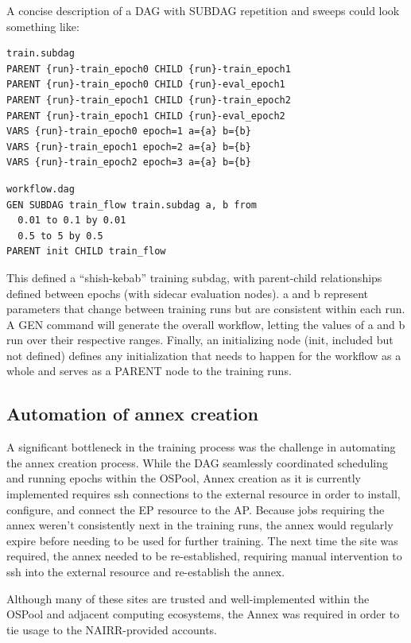 \documentclass{article}
\begin{document}
A concise description of a DAG with SUBDAG repetition and sweeps could look something like:

\begin{verbatim}
train.subdag
PARENT {run}-train_epoch0 CHILD {run}-train_epoch1
PARENT {run}-train_epoch0 CHILD {run}-eval_epoch1
PARENT {run}-train_epoch1 CHILD {run}-train_epoch2
PARENT {run}-train_epoch1 CHILD {run}-eval_epoch2
VARS {run}-train_epoch0 epoch=1 a={a} b={b}
VARS {run}-train_epoch1 epoch=2 a={a} b={b}
VARS {run}-train_epoch2 epoch=3 a={a} b={b}
\end{verbatim}


\begin{verbatim}
workflow.dag
GEN SUBDAG train_flow train.subdag a, b from
  0.01 to 0.1 by 0.01
  0.5 to 5 by 0.5
PARENT init CHILD train_flow
\end{verbatim}

This defined a ``shish-kebab'' training subdag, with parent-child relationships
defined between epochs (with sidecar evaluation nodes). a and b represent
parameters that change between training runs but are consistent within each run.
A GEN command will generate the overall workflow, letting the values of a and b
run over their respective ranges. Finally, an initializing node (init, included
but not defined) defines any initialization that needs to happen for the
workflow as a whole and serves as a PARENT node to the training runs.

\subsection{Automation of annex creation}
A significant bottleneck in the training process was the challenge in automating
the annex creation process. While the DAG seamlessly coordinated scheduling and
running epochs within the OSPool, Annex creation as it is currently implemented
requires ssh connections to the external resource in order to install,
configure, and connect the EP resource to the AP. Because jobs requiring the
annex weren't consistently next in the training runs, the annex would regularly
expire before needing to be used for further training. The next time the site
was required, the annex needed to be re-established, requiring manual
intervention to ssh into the external resource and re-establish the annex.

Although many of these sites are trusted and well-implemented within the OSPool
and adjacent computing ecosystems, the Annex was required in order to tie usage
to the NAIRR-provided accounts.
\end{document}
